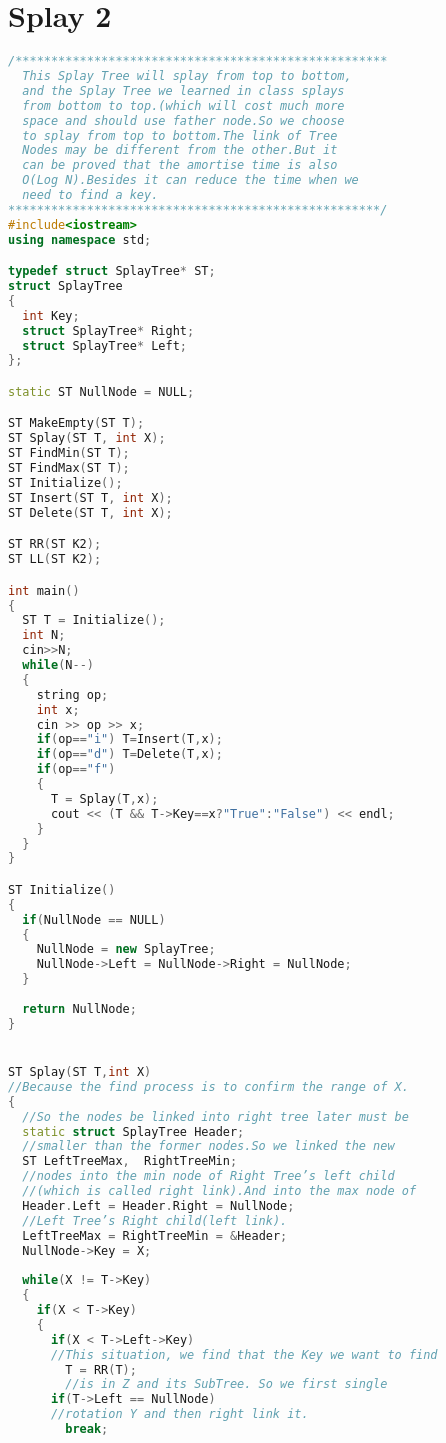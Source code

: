 \documentclass[UTF8]{report}
\numberwithin{figure}{subsection}
\numberwithin{table}{subsection}
\begin{document}
\section{Splay 2}
\begin{lstlisting}[language=c++]
/**************************************************** 
  This Splay Tree will splay from top to bottom,
  and the Splay Tree we learned in class splays
  from bottom to top.(which will cost much more
  space and should use father node.So we choose
  to splay from top to bottom.The link of Tree
  Nodes may be different from the other.But it 
  can be proved that the amortise time is also
  O(Log N).Besides it can reduce the time when we
  need to find a key.
****************************************************/
#include<iostream>
using namespace std;

typedef struct SplayTree* ST;
struct SplayTree
{
  int Key;
  struct SplayTree* Right;
  struct SplayTree* Left;
};

static ST NullNode = NULL;

ST MakeEmpty(ST T);
ST Splay(ST T, int X);
ST FindMin(ST T);
ST FindMax(ST T);
ST Initialize();
ST Insert(ST T, int X);
ST Delete(ST T, int X);

ST RR(ST K2);
ST LL(ST K2);

int main()
{
  ST T = Initialize();
  int N;
  cin>>N;
  while(N--)
  {
    string op;
    int x;
    cin >> op >> x;
    if(op=="i") T=Insert(T,x);
    if(op=="d") T=Delete(T,x);
    if(op=="f")
    {
      T = Splay(T,x);
      cout << (T && T->Key==x?"True":"False") << endl;
    }
  }
} 

ST Initialize()
{
  if(NullNode == NULL)
  {
    NullNode = new SplayTree;
    NullNode->Left = NullNode->Right = NullNode;
  }
  
  return NullNode;
}


ST Splay(ST T,int X)
//Because the find process is to confirm the range of X.
{
  //So the nodes be linked into right tree later must be
  static struct SplayTree Header;
  //smaller than the former nodes.So we linked the new 
  ST LeftTreeMax,  RightTreeMin;
  //nodes into the min node of Right Tree’s left child
  //(which is called right link).And into the max node of 
  Header.Left = Header.Right = NullNode;
  //Left Tree’s Right child(left link).
  LeftTreeMax = RightTreeMin = &Header;
  NullNode->Key = X;
  
  while(X != T->Key)
  {
    if(X < T->Key)
    {
      if(X < T->Left->Key)
      //This situation, we find that the Key we want to find 
        T = RR(T);
        //is in Z and its SubTree. So we first single 
      if(T->Left == NullNode)
      //rotation Y and then right link it.
        break;                    
      

\end{lstlisting}
\end{document}
